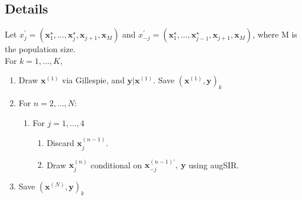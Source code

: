 \documentclass[11pt]{article}
\newcommand{\bx}{\mathbf{x}}
\newcommand{\by}{\mathbf{y}}
\begin{document}
\subsection*{Details}
Let $ x_j^\prime = (\bx_1^\star,\dots,\bx_{j}^\star,\bx_{j+1},\bx_{M})$ and $ x_{-j}^\prime = (\bx_1^\star,\dots,\bx_{j-1}^\star,\bx_{j+1},\bx_{M})$, where M is the population size.\\
For $ k = 1,\dots,K $,
\begin{enumerate}
	\item Draw $ \bx^{(1)} $ via Gillespie, and $ \by|\bx^{(1)} $. Save $ (\bx^{(1)}, \by)_{k} $
	\item For $ n = 2,\dots,N $:
	\begin{enumerate}
		\item For $ j=1,\dots,4 $
		\begin{enumerate}
			\item Discard $ \bx_j^{(n-1)} $.
			\item Draw $ \bx_j^{(n)} $ conditional on $ \bx_{-j}^{(n-1) \prime},\ \by $ using augSIR.
		\end{enumerate}
	\end{enumerate} 
	\item Save $ (\bx^{(N)}, \by)_{k} $
\end{enumerate}
\end{document}
